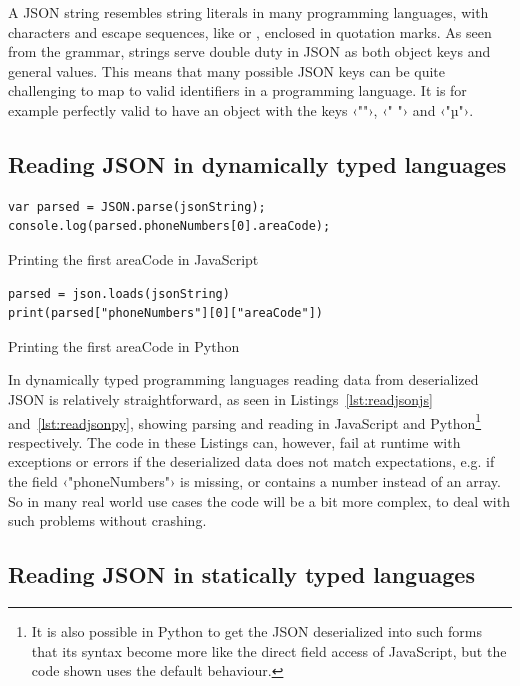 A JSON string resembles string literals in many programming languages, with characters and escape sequences, like  or , enclosed in quotation marks. As seen from the grammar, strings serve double duty in JSON as both object keys and general values. This means that many possible JSON keys can be quite challenging to map to valid identifiers in a programming language. It is for example perfectly valid to have an object with the keys ‹""›, ‹" "› and ‹"µ"›.


\subsection{Reading JSON in dynamically typed languages}

\begin{listing}[ht!]
\begin{verbatim}
var parsed = JSON.parse(jsonString);
console.log(parsed.phoneNumbers[0].areaCode);
\end{verbatim}
\caption{Printing the first areaCode in JavaScript}
\label{lst:readjsonjs}
\end{listing}

\begin{listing}[ht!]
\begin{verbatim}
parsed = json.loads(jsonString)
print(parsed["phoneNumbers"][0]["areaCode"])
\end{verbatim}
\caption{Printing the first areaCode in Python}
\label{lst:readjsonpy}
\end{listing}

In dynamically typed programming languages reading data from deserialized JSON is relatively straightforward, as seen in Listings~\ref{lst:readjsonjs} and~\ref{lst:readjsonpy}, showing parsing and reading in JavaScript and Python\footnote{It is also possible in Python to get the JSON deserialized into such forms that its syntax become more like the direct field access of JavaScript, but the code shown uses the default behaviour.} respectively. The code in these Listings can, however, fail at runtime with exceptions or errors if the deserialized data does not match expectations, e.g. if the field ‹"phoneNumbers"› is missing, or contains a number instead of an array. So in many real world use cases the code will be a bit more complex, to deal with such problems without crashing.

\subsection{Reading JSON in statically typed languages}

